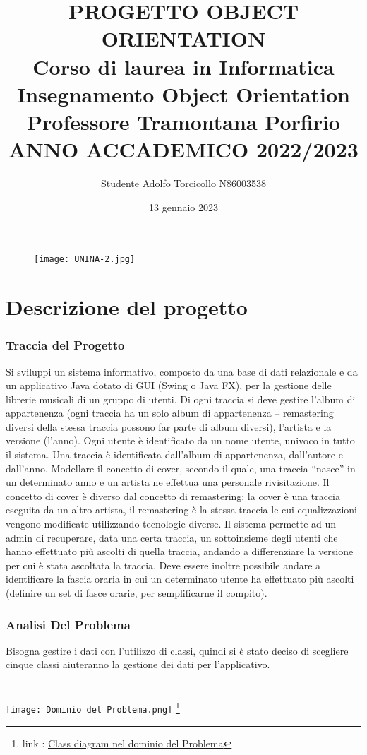 \documentclass[11pt]{article}
\title{PROGETTO OBJECT ORIENTATION\\Corso di laurea in Informatica\\Insegnamento Object Orientation
\\ Professore Tramontana Porfirio \\ANNO ACCADEMICO 2022/2023  }
\author{Studente Adolfo Torcicollo N86003538}
\date{13 gennaio 2023}
\begin{document}
	\begin{figure}
		\centering
		\texttt{[image: UNINA-2.jpg]}
		\maketitle
	\end{figure}


	\clearpage

	\part{Descrizione del progetto}
	\section{Traccia del Progetto}

	Si sviluppi un sistema informativo, composto da una base di dati relazionale e da un applicativo Java dotato di GUI (Swing o 
	Java FX), per la gestione delle librerie musicali di un gruppo di utenti. Di ogni traccia si deve gestire l’album di appartenenza 
	(ogni traccia ha un solo album di appartenenza – remastering diversi della stessa traccia possono far parte di album diversi), 
	l’artista e la versione (l’anno). Ogni utente è identificato da un nome utente, univoco in tutto il sistema. Una traccia è 
	identificata dall’album di appartenenza, dall’autore e dall’anno. Modellare il concetto di cover, secondo il quale, una traccia 
	“nasce” in un determinato anno e un artista ne effettua una personale rivisitazione. Il concetto di cover è diverso dal concetto
	di remastering: la cover è una traccia eseguita da un altro artista, il remastering è la stessa traccia le cui equalizzazioni vengono 
	modificate utilizzando tecnologie diverse. Il sistema permette ad un admin di recuperare, data una certa traccia, un 
	sottoinsieme degli utenti che hanno effettuato più ascolti di quella traccia, andando a differenziare la versione per cui è stata 
	ascoltata la traccia. Deve essere inoltre possibile andare a identificare la fascia oraria in cui un determinato utente ha 
	effettuato più ascolti (definire un set di fasce orarie, per semplificarne il compito).

	\section{Analisi Del Problema}
	Bisogna gestire i dati con l'utilizzo di classi, quindi si è stato deciso di scegliere cinque classi aiuteranno la gestione dei dati per
	l'applicativo.
	\\
	\\
	\\
	\texttt{[image: Dominio del Problema.png]} \footnote{link : \href{https://github.com/torcy-it/LettoreMusicale/tree/main/DocumentazioneProgetto/ClassDiagrams}{Class diagram nel dominio del Problema}}
\end{document}
